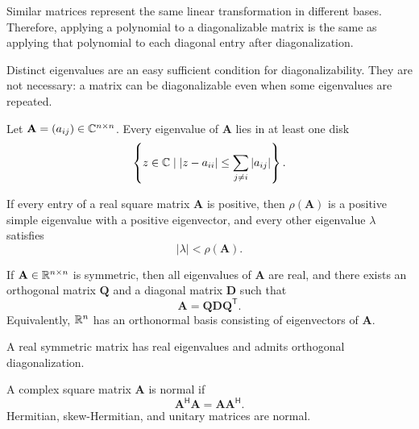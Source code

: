     \begin{idea}
        Similar matrices represent the same linear transformation in different
        bases. Therefore, applying a polynomial to a diagonalizable matrix is
        the same as applying that polynomial to each diagonal entry after
        diagonalization.
    \end{idea}

    \begin{strategy}
        Distinct eigenvalues are an easy sufficient condition for
        diagonalizability. They are not necessary: a matrix can be
        diagonalizable even when some eigenvalues are repeated.
    \end{strategy}

    \begin{theorem}
        Let $\mathbf{A}=(a_{ij})\in\mathbb{C}^{n\times n}$. Every eigenvalue of
        $\mathbf{A}$ lies in at least one disk
        \[
            \left\{z\in\mathbb{C}\mid
            |z-a_{ii}|\leq\sum_{j\neq i}|a_{ij}|
            \right\}.
        \]
    \end{theorem}

    \begin{theorem}
        If every entry of a real square matrix $\mathbf{A}$ is positive, then
        $\rho(\mathbf{A})$ is a positive simple eigenvalue with a positive
        eigenvector, and every other eigenvalue $\lambda$ satisfies
        \[
            |\lambda|<\rho(\mathbf{A}).
        \]
    \end{theorem}

    \begin{theorem}
        If $\mathbf{A}\in\mathbb{R}^{n\times n}$ is symmetric, then all eigenvalues of
        $\mathbf{A}$ are real, and there exists an orthogonal matrix
        $\mathbf{Q}$ and a diagonal matrix $\mathbf{D}$ such that
        \[
            \mathbf{A}
            =
            \mathbf{Q}\mathbf{D}\mathbf{Q}^{\mathsf T}.
        \]
        Equivalently, $\mathbb{R}^n$ has an orthonormal basis consisting of eigenvectors
        of $\mathbf{A}$.
    \end{theorem}

    \begin{remark}
        A real symmetric matrix has real eigenvalues and admits orthogonal
        diagonalization.
    \end{remark}

    \begin{definition}
        A complex square matrix $\mathbf{A}$ is normal if
        \[
            \mathbf{A}^{\mathsf H}\mathbf{A}
            =
            \mathbf{A}\mathbf{A}^{\mathsf H}.
        \]
        Hermitian, skew-Hermitian, and unitary matrices are normal.
    \end{definition}

